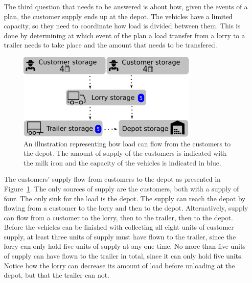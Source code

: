The third question that needs to be answered is about how, given the events of a plan, the customer supply ends up at the depot.
The vehicles have a limited capacity, so they need to coordinate how load is divided between them.
This is done by determining at which event of the plan a load transfer from a lorry to a trailer needs to take place and the amount that needs to be transfered.
\\







\begin{figure}[!h]
  \centering
    \includegraphics[width=0.8\textwidth]{img/trivial_flow_simplified_v2.pdf}
  \caption{An illustration representing how load can flow from the customers to the depot. The amount of supply of the customers is indicated with the milk icon and the capacity of the vehicles is indicated in blue. }
  \label{fig:flow_simplified}
\end{figure}

The customers' supply flow from customers to the depot as presented in Figure~\ref{fig:flow_simplified}.
The only sources of supply are the customers, both with a supply of four.
The only sink for the load is the depot.
The supply can reach the depot by flowing from a customer to the lorry and then to the depot.
Alternatively, supply can flow from a customer to the lorry, then to the trailer, then to the depot.
Before the vehicles can be finished with collecting all eight units of customer supply, at least three units of supply must have flown to the trailer, since the lorry can only hold five units of supply at any one time.
No more than five units of supply can have flown to the trailer in total, since it can only hold five units.
Notice how the lorry can decrease its amount of load before unloading at the depot, but that the trailer can not.  \\

